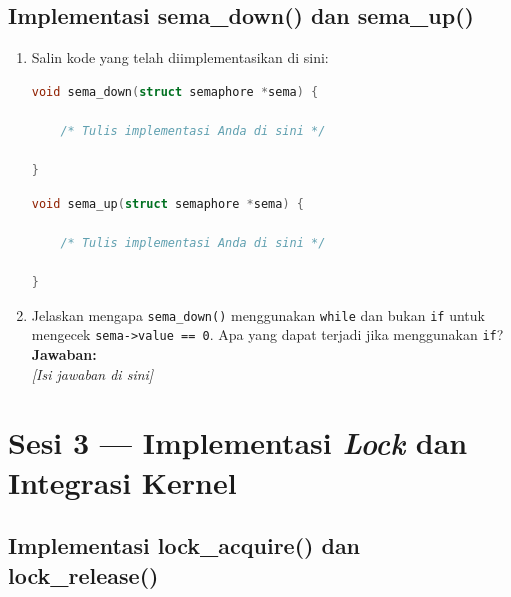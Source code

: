 \subsection{Implementasi sema\_down() dan sema\_up()}

\begin{enumerate}

	\item Salin kode yang telah diimplementasikan di sini:

	      \begin{lstlisting}[language=C, caption={Implementasi \texttt{sema\_down()} oleh mahasiswa}]
void sema_down(struct semaphore *sema) {

    /* Tulis implementasi Anda di sini */

}
    \end{lstlisting}

	      \begin{lstlisting}[language=C, caption={Implementasi \texttt{sema\_up()} oleh mahasiswa}]
void sema_up(struct semaphore *sema) {

    /* Tulis implementasi Anda di sini */

}
    \end{lstlisting}

	\item Jelaskan mengapa \texttt{sema\_down()} menggunakan \texttt{while} dan bukan \texttt{if} untuk mengecek \texttt{sema->value == 0}. Apa yang dapat terjadi jika menggunakan \texttt{if}?\\[0.2cm]
	      \textbf{Jawaban:}\\
	      \textit{[Isi jawaban di sini]}

\end{enumerate}

\section{Sesi 3 — Implementasi \textit{Lock} dan Integrasi Kernel}

\subsection{Implementasi lock\_acquire() dan lock\_release()}

